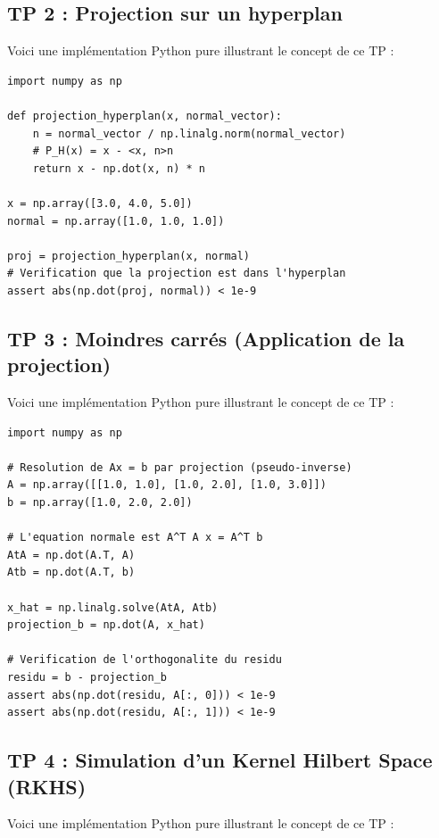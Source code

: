 \documentclass[11pt,a4paper]{article}
\begin{document}
\subsection*{TP 2 : Projection sur un hyperplan}

Voici une implémentation Python pure illustrant le concept de ce TP :


\begin{lstlisting}
import numpy as np

def projection_hyperplan(x, normal_vector):
    n = normal_vector / np.linalg.norm(normal_vector)
    # P_H(x) = x - <x, n>n
    return x - np.dot(x, n) * n

x = np.array([3.0, 4.0, 5.0])
normal = np.array([1.0, 1.0, 1.0])

proj = projection_hyperplan(x, normal)
# Verification que la projection est dans l'hyperplan
assert abs(np.dot(proj, normal)) < 1e-9
\end{lstlisting}



\subsection*{TP 3 : Moindres carrés (Application de la projection)}

Voici une implémentation Python pure illustrant le concept de ce TP :


\begin{lstlisting}
import numpy as np

# Resolution de Ax = b par projection (pseudo-inverse)
A = np.array([[1.0, 1.0], [1.0, 2.0], [1.0, 3.0]])
b = np.array([1.0, 2.0, 2.0])

# L'equation normale est A^T A x = A^T b
AtA = np.dot(A.T, A)
Atb = np.dot(A.T, b)

x_hat = np.linalg.solve(AtA, Atb)
projection_b = np.dot(A, x_hat)

# Verification de l'orthogonalite du residu
residu = b - projection_b
assert abs(np.dot(residu, A[:, 0])) < 1e-9
assert abs(np.dot(residu, A[:, 1])) < 1e-9
\end{lstlisting}



\subsection*{TP 4 : Simulation d'un Kernel Hilbert Space (RKHS)}

Voici une implémentation Python pure illustrant le concept de ce TP :
\end{document}
